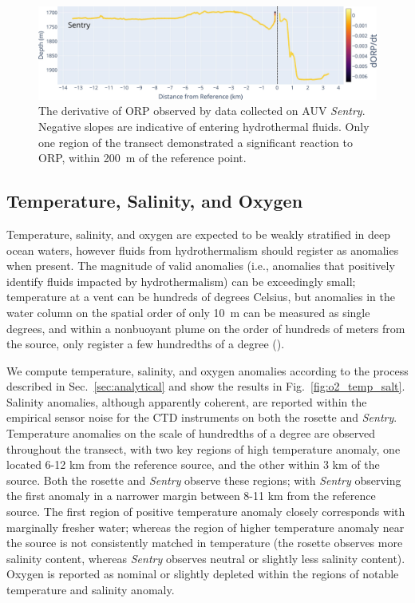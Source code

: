 \begin{figure}[h!]
    \centering
    \includegraphics[width=\columnwidth]{figures/chap3_orp_over_distance.jpg}
    \caption{The derivative of ORP observed by data collected on AUV \emph{Sentry}. Negative slopes are indicative of entering hydrothermal fluids. Only one region of the transect demonstrated a significant reaction to ORP, within \SI{200}{\meter} of the reference point.}
    \label{fig:orp_distance}
\end{figure}

\subsection{Temperature, Salinity, and Oxygen}
\label{sec:o2_temp_salt}
Temperature, salinity, and oxygen are expected to be weakly stratified in deep ocean waters, however fluids from hydrothermalism should register as anomalies when present. The magnitude of valid anomalies (i.e., anomalies that positively identify fluids impacted by hydrothermalism) can be exceedingly small; temperature at a vent can be hundreds of degrees Celsius, but anomalies in the water column on the spatial order of only \SI{10}{\meter} can be measured as single degrees, and within a nonbuoyant plume on the order of hundreds of meters from the source, only register a few hundredths of a degree (\cite{yoerger2007autonomous}). 

We compute temperature, salinity, and oxygen anomalies according to the process described in Sec.~\ref{sec:analytical} and show the results in Fig.~\ref{fig:o2_temp_salt}. Salinity anomalies, although apparently coherent, are reported within the empirical sensor noise for the CTD instruments on both the rosette and \emph{Sentry}. Temperature anomalies on the scale of hundredths of a degree are observed throughout the transect, with two key regions of high temperature anomaly, one located 6-12 km from the reference source, and the other within 3 km of the source. Both the rosette and \emph{Sentry} observe these regions; with \emph{Sentry} observing the first anomaly in a narrower margin between 8-11 km from the reference source. The first region of positive temperature anomaly closely corresponds with marginally fresher water; whereas the region of higher temperature anomaly near the source is not consistently matched in temperature (the rosette observes more salinity content, whereas \emph{Sentry} observes neutral or slightly less salinity content). Oxygen is reported as nominal or slightly depleted within the regions of notable temperature and salinity anomaly.

